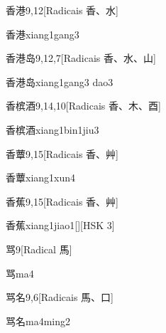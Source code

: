 \begin{entry}{香港}{9,12}[Radicais ⾹、⽔]
  \begin{phonetics}{香港}{xiang1gang3}
  \end{phonetics}
\end{entry}

\begin{entry}{香港岛}{9,12,7}[Radicais ⾹、⽔、⼭]
  \begin{phonetics}{香港岛}{xiang1gang3 dao3}
  \end{phonetics}
\end{entry}

\begin{entry}{香槟酒}{9,14,10}[Radicais ⾹、⽊、⾣]
  \begin{phonetics}{香槟酒}{xiang1bin1jiu3}
  \end{phonetics}
\end{entry}

\begin{entry}{香蕈}{9,15}[Radicais ⾹、⾋]
  \begin{phonetics}{香蕈}{xiang1xun4}
  \end{phonetics}
\end{entry}

\begin{entry}{香蕉}{9,15}[Radicais ⾹、⾋]
  \begin{phonetics}{香蕉}{xiang1jiao1}[][HSK 3]
  \end{phonetics}
\end{entry}

\begin{entry}{骂}{9}[Radical ⾺]
  \begin{phonetics}{骂}{ma4}
  \end{phonetics}
\end{entry}

\begin{entry}{骂名}{9,6}[Radicais ⾺、⼝]
  \begin{phonetics}{骂名}{ma4ming2}
  \end{phonetics}
\end{entry}

